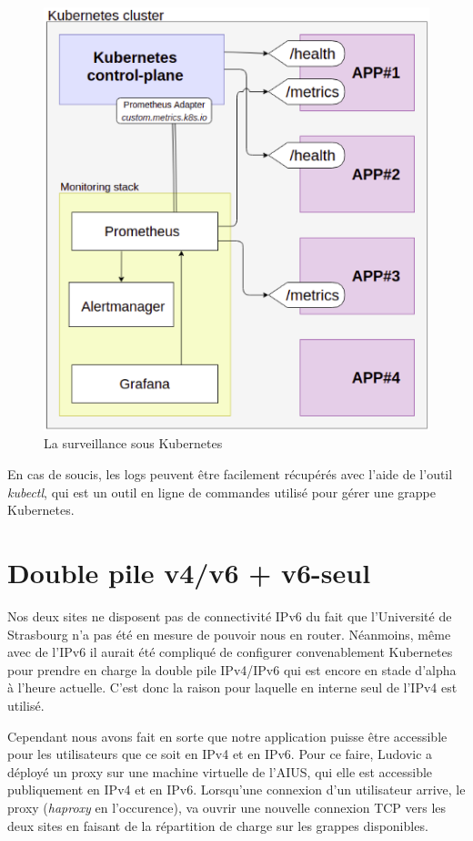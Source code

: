 \begin{figure}[h]
  \caption{\label{monitor} La surveillance sous Kubernetes}
  \includegraphics[width=15cm]{images/monitoring}
\end{figure}

En cas de soucis, les logs peuvent être facilement récupérés avec l'aide
de l'outil \textit{kubectl}, qui est un outil en ligne de commandes
utilisé pour gérer une grappe Kubernetes.

\section{Double pile v4/v6 + v6-seul}

Nos deux sites ne disposent pas de connectivité IPv6 du fait que
l'Université de Strasbourg n'a pas été en mesure de pouvoir nous en
router. Néanmoins, même avec de l'IPv6 il aurait été compliqué de
configurer convenablement Kubernetes pour prendre en charge la double
pile IPv4/IPv6 qui est encore en stade d'alpha à l'heure actuelle. C'est
donc la raison pour laquelle en interne seul de l'IPv4 est utilisé.

Cependant nous avons fait en sorte que notre application puisse être
accessible pour les utilisateurs que ce soit en IPv4 et en IPv6. Pour ce
faire, Ludovic a déployé un proxy sur une machine virtuelle de l'AIUS,
qui elle est accessible publiquement en IPv4 et en IPv6. Lorsqu'une
connexion d'un utilisateur arrive, le proxy (\textit{haproxy} en
l'occurence), va ouvrir une nouvelle connexion TCP vers les deux sites
en faisant de la répartition de charge sur les grappes disponibles.
